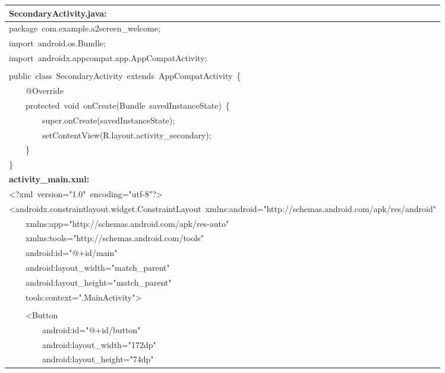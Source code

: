 \documentclass[a4paper,12pt]{article}
\begin{document}
\begin{longtable}{|p{}|}
\hline
\rule{0pt}{13pt}\textbf{SecondaryActivity.java:} \\
\hline
{\ttfamily\small package\ com.example.a2screen\_welcome;} \\
{\ttfamily\small import\ android.os.Bundle;} \\
{\ttfamily\small import\ androidx.appcompat.app.AppCompatActivity;} \\
\strut \\
{\ttfamily\small public\ class\ SecondaryActivity\ extends\ AppCompatActivity\ \{} \\
{\ttfamily\small \ \ \ \ @Override} \\
{\ttfamily\small \ \ \ \ protected\ void\ onCreate(Bundle\ savedInstanceState)\ \{} \\
{\ttfamily\small \ \ \ \ \ \ \ \ super.onCreate(savedInstanceState);} \\
{\ttfamily\small \ \ \ \ \ \ \ \ setContentView(R.layout.activity\_secondary);} \\
{\ttfamily\small \ \ \ \ \}} \\
{\ttfamily\small \}} \\
\hline
\rule{0pt}{13pt}\textbf{activity\_main.xml:} \\
\hline
{\ttfamily\small \textless{}?xml\ version="1.0"\ encoding="utf-8"?\textgreater{}} \\
{\ttfamily\small \textless{}androidx.constraintlayout.widget.ConstraintLayout\ xmlns:android="http://schemas.android.com/apk/res/android"} \\
{\ttfamily\small \ \ \ \ xmlns:app="http://schemas.android.com/apk/res-auto"} \\
{\ttfamily\small \ \ \ \ xmlns:tools="http://schemas.android.com/tools"} \\
{\ttfamily\small \ \ \ \ android:id="@+id/main"} \\
{\ttfamily\small \ \ \ \ android:layout\_width="match\_parent"} \\
{\ttfamily\small \ \ \ \ android:layout\_height="match\_parent"} \\
{\ttfamily\small \ \ \ \ tools:context=".MainActivity"\textgreater{}} \\
\strut \\
{\ttfamily\small \ \ \ \ \textless{}Button} \\
{\ttfamily\small \ \ \ \ \ \ \ \ android:id="@+id/button"} \\
{\ttfamily\small \ \ \ \ \ \ \ \ android:layout\_width="172dp"} \\
{\ttfamily\small \ \ \ \ \ \ \ \ android:layout\_height="74dp"} \\

\end{longtable}
\end{document}
